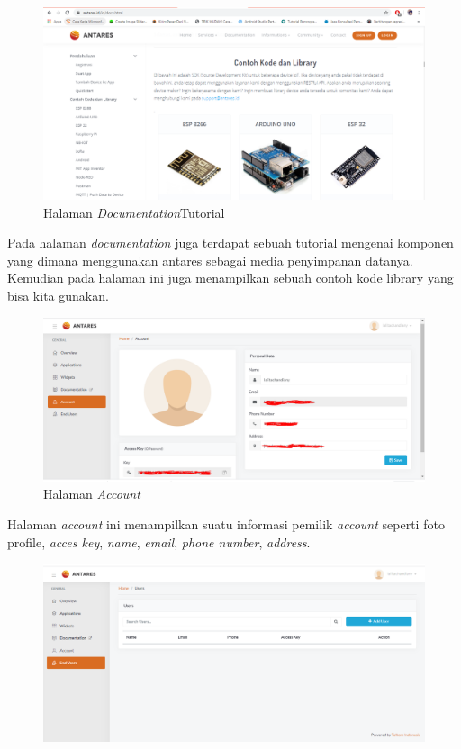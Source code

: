 \begin{enumerate}
       \begin{figure}[H]
    \centering
    \includegraphics[width=1\textwidth]{figures/antares12.png}
    \caption{Halaman \textit{Documentation}Tutorial}
    \label{print}
    \end{figure}
    \par Pada halaman \textit{documentation} juga terdapat sebuah tutorial mengenai komponen yang dimana menggunakan antares sebagai media penyimpanan datanya. Kemudian pada halaman ini juga menampilkan sebuah contoh kode library yang bisa kita gunakan.
      \begin{figure}[H]
    \centering
    \includegraphics[width=1\textwidth]{figures/antares13.png}
    \caption{Halaman \textit{Account}}
    \label{print}
    \end{figure}
    \par Halaman \textit{account} ini menampilkan suatu informasi pemilik \textit{account} seperti foto profile, \textit{acces key}, \textit{name}, \textit{email}, \textit{phone number}, \textit{address}.
      \begin{figure}[H]
    \centering
    \includegraphics[width=1\textwidth]{figures/antares14.png}

\end{figure}
\end{enumerate}
